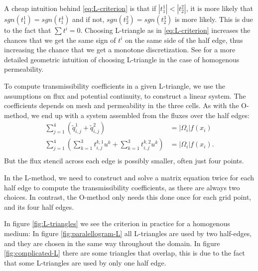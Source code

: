 \documentclass[../Main/main.tex]{subfiles}
\begin{document}
	A cheap intuition behind \eqref{eq:L-criterion} is that if $|t_1^1|<|t_2^2|$, it is more likely that $sgn(t_1^1) = sgn(t_1^4)$ and if not, $sgn(t_2^2) = sgn(t_2^3)$ is more likely. This is due to the fact that $\sum t^i = 0$. Choosing L-triangle as in \eqref{eq:L-criterion} increases the chances that we get the same sign of $t^i$ on the same side of the half edge, thus increasing the chance that we get a monotone discretization.  See \cite{https://doi.org/10.1002/fld.1926} for a more detailed geometric intuition of choosing L-triangle in the case of homogenous permeability. 
	\par 
	To compute transmissibility coefficients in a given L-triangle, we use the assumptions on flux and potential continuity, to construct a linear system. The coefficients depends on mesh and permeability in the three cells. 
		As with the O-method, we end up with a system assembled from the fluxes over the half edges:
	\begin{equation}
		\begin{aligned}
			\sum_{j=1}^4 (\tilde{q}_{i,j}^1 + \tilde{q}_{i,j}^2) &= |\Omega_i|f(x_i) \\
			\sum_{j=1}^4 (\sum_{k=1}^3 t^{k,1}_{i,j}u^k + \sum_{k=1}^3 t^{k,2}_{i,j}u^k)&= |\Omega_i|f(x_i).\\
		\end{aligned}
	\end{equation}
	But the flux stencil across each edge is possibly smaller, often just four points.
	\begin{remark}
		In the L-method, we need to construct and solve a matrix equation twice for each half edge to compute the transmissibility coefficients, as there are always two choices. In contrast, the O-method only needs this done once for each grid point, and its four half edges.
	\end{remark}
	\par
	In figure \ref{fig:L-triangles} we see the criterion in practice for a homogenous medium: In figure \ref{fig:paralellogram-L} all L-triangles are used by two half-edges, and they are chosen in the same way throughout the domain. In figure \ref{fig:complicated-L} there are some triangles that overlap, this is due to the fact that some L-triangles are used by only one half edge.
\end{document}
